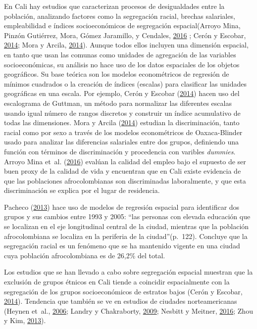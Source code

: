 \documentclass[12pt,a4paper,openany]{book}
\theoremstyle{definition}
\theoremstyle{definition}
\theoremstyle{definition}
\theoremstyle{remark}
\begin{document}
En Cali hay estudios que caracterizan procesos de desigualdades entre la
población, analizando factores como la segregación racial, brechas
salariales, empleabilidad e índices socioeconómicos de segregación
espacial(Arroyo Mina, Pinzón Gutiérrez, Mora, Gómez Jaramillo, y
Cendales, \protect\hyperlink{ref-arroyo_mina_afrocolombianos_2016}{2016}
; Cerón y Escobar, \protect\hyperlink{ref-ceron_indice_2014}{2014}; Mora
y Arcila, \protect\hyperlink{ref-mora_brechas_2014}{2014}). Aunque todos
ellos incluyen una dimensión espacial, en tanto que usan las comunas
como unidades de agregación de las variables socioeconómicas, su
análisis no hace uso de los datos espaciales de los objetos geográficos.
Su base teórica son los modelos econométricos de regresión de mínimos
cuadrados o la creación de índices (escalas) para clasificar las
unidades geográficas en una escala. Por ejemplo, Cerón y Escobar
(\protect\hyperlink{ref-ceron_indice_2014}{2014}) hacen uso del
escalograma de Guttman, un método para normalizar las diferentes escalas
usando igual número de rangos discretos y construir un índice
acumulativo de todas las dimensiones. Mora y Arcila
(\protect\hyperlink{ref-mora_brechas_2014}{2014}) estudian la
discriminación, tanto racial como por sexo a través de los modelos
econométricos de Oaxaca-Blinder usado para analizar las diferencias
salariales entre dos grupos, definiendo una función con términos de
discriminación y procedencia con varibles \emph{dummies}. Arroyo Mina
et~al. (\protect\hyperlink{ref-arroyo_mina_afrocolombianos_2016}{2016})
evalúan la calidad del empleo bajo el supuesto de ser buen proxy de la
calidad de vida y encuentran que en Cali existe evidencia de que las
poblaciones afrocolombianas son discriminadas laboralmente, y que esta
discriminación se explica por el lugar de residencia.

Pacheco (\protect\hyperlink{ref-PACHECO2013121}{2013}) hace uso de
modelos de regresión espacial para identificar dos grupos y sus cambios
entre 1993 y 2005: ``las personas con elevada educación que se localizan
en el eje longitudinal central de la ciudad, mientras que la población
afrocolombiana se localiza en la periferia de la ciudad''(p.~122).
Concluye que la segregación racial es un fenómeno que se ha mantenido
vigente en una ciudad cuya población afrocolombiana es de 26,2\% del
total.

Los estudios que se han llevado a cabo sobre segregación espacial
muestran que la exclusión de grupos étnicos en Cali tiende a coincidir
espacialmente con la segregación de los grupos socioeconómicos de
estratos bajos (Cerón y Escobar,
\protect\hyperlink{ref-ceron_indice_2014}{2014}). Tendencia que también
se ve en estudios de ciudades norteamericanas (Heynen et~al.,
\protect\hyperlink{ref-heynen_political_2006}{2006}; Landry y
Chakraborty, \protect\hyperlink{ref-landry_street_2009}{2009}; Nesbitt y
Meitner, \protect\hyperlink{ref-nesbitt_exploring_2016}{2016}; Zhou y
Kim, \protect\hyperlink{ref-zhou_social_2013}{2013}).
\end{document}
